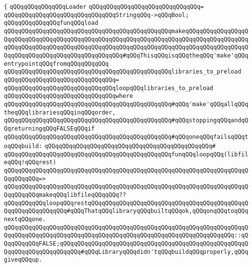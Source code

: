 \verb|{|\newline
\verb|qQQqqQQqqQQqqQQqLoader|\newline
\verb|qQQqqQQqqQQqqQQqqQQqqQQqqQQqqQQq=|\newline
\verb|qQQqqQQqqQQqqQQqqQQqqQQqqQQqqQQqStringqQQq->qQQqBool;|\newline
\newline
\verb|qQQqqQQqqQQqqQQqfunqQQqload|\newline
\verb|qQQqqQQqqQQqqQQqqQQqqQQqqQQqqQQqqQQqqQQqqQQqqQQqmakeqQQqqQQqqQQqqQQqqQQqqQQqqQQqqQQqqQQqqQQqqQQqqQQqqQQqqQQqqQQqqQQqqQQqqQQqqQQqqQQqqQQqqQQqqQQqqQQqqQQqqQQqqQQqqQQqqQQqqQQqqQQqqQQqqQQqqQQqqQQqqQQqqQQqqQQqqQQqqQQqqQQqqQQqqQQqqQQqqQQqqQQqqQQqqQQq#qQQqThisqQQqisqQQqtheqQQq'make'qQQqentrypointqQQqfromqQQqqQQqqQQq|\newline
\verb|qQQqqQQqqQQqqQQqqQQqqQQqqQQqqQQqqQQqqQQqqQQqqQQqlibraries_to_preload|\newline
\verb|qQQqqQQqqQQqqQQqqQQqqQQqqQQqqQQq=|\newline
\verb|qQQqqQQqqQQqqQQqqQQqqQQqqQQqqQQqloopqQQqlibraries_to_preload|\newline
\verb|qQQqqQQqqQQqqQQqqQQqqQQqqQQqqQQqwhere|\newline
\newline
\verb|qQQqqQQqqQQqqQQqqQQqqQQqqQQqqQQqqQQqqQQqqQQqqQQq#qQQq'make'qQQqallqQQqtheqQQqlibrariesqQQqinqQQqorder,|\newline
\verb|qQQqqQQqqQQqqQQqqQQqqQQqqQQqqQQqqQQqqQQqqQQqqQQq#qQQqstoppingqQQqandqQQqreturningqQQqFALSEqQQqif|\newline
\verb|qQQqqQQqqQQqqQQqqQQqqQQqqQQqqQQqqQQqqQQqqQQqqQQq#qQQqoneqQQqfailsqQQqtoqQQqbuild:|\newline
\verb|qQQqqQQqqQQqqQQqqQQqqQQqqQQqqQQqqQQqqQQqqQQqqQQq#|\newline
\verb|qQQqqQQqqQQqqQQqqQQqqQQqqQQqqQQqqQQqqQQqqQQqqQQqfunqQQqloopqQQq(libfileqQQq!qQQqrest)|\newline
\verb|qQQqqQQqqQQqqQQqqQQqqQQqqQQqqQQqqQQqqQQqqQQqqQQqqQQqqQQqqQQqqQQqqQQqqQQqqQQqqQQq=>|\newline
\verb|qQQqqQQqqQQqqQQqqQQqqQQqqQQqqQQqqQQqqQQqqQQqqQQqqQQqqQQqqQQqqQQqqQQqqQQqqQQqqQQqmakeqQQqlibfileqQQqqQQq??qQQqqQQqqQQqloopqQQqrestqQQqqQQqqQQqqQQqqQQqqQQqqQQqqQQqqQQqqQQqqQQqqQQqqQQqqQQqqQQqqQQq#qQQqThatqQQqlibraryqQQqbuiltqQQqok,qQQqonqQQqtoqQQqnextqQQqone.|\newline
\verb|qQQqqQQqqQQqqQQqqQQqqQQqqQQqqQQqqQQqqQQqqQQqqQQqqQQqqQQqqQQqqQQqqQQqqQQqqQQqqQQqqQQqqQQqqQQqqQQqqQQqqQQqqQQqqQQqqQQqqQQqqQQqqQQqqQQqqQQq::qQQqqQQqqQQqFALSE;qQQqqQQqqQQqqQQqqQQqqQQqqQQqqQQqqQQqqQQqqQQqqQQqqQQqqQQqqQQqqQQqqQQqqQQqqQQq#qQQqLibraryqQQqdidn'tqQQqbuildqQQqproperly,qQQqgiveqQQqup.|\newline
